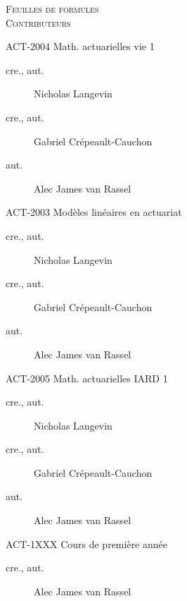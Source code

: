 \documentclass[10pt, french]{article}
\begin{document}
\center %

\textsc{\LARGE Feuilles de formules}\\[0.5cm]
\textsc{\Large Contributeurs}\\[0.5cm] 

\begin{multicols*}{3}

\begin{vie}{ACT-2004\: Math. actuarielles vie 1}
\begin{description}
	\item[cre., aut.] Nicholas Langevin
	\item[cre., aut.] Gabriel Crépeault-Cauchon 
	\item[aut.] Alec James van Rassel
\end{description}
\end{vie}

\begin{modeles}{ACT-2003\: Modèles linéaires en actuariat}
\begin{description}
	\item[cre., aut.] Nicholas Langevin
	\item[cre., aut.] Gabriel Crépeault-Cauchon 
	\item[aut.] Alec James van Rassel
\end{description}
\end{modeles}

\begin{IARD}{ACT-2005\: Math. actuarielles IARD 1}
\begin{description}
	\item[cre., aut.] Nicholas Langevin
	\item[cre., aut.] Gabriel Crépeault-Cauchon 
	\item[aut.] Alec James van Rassel
\end{description}
\end{IARD}

\begin{1XXX}{ACT-1XXX\: Cours de première année}
\begin{description}
	\item[cre., aut.] Alec James van Rassel
\end{description}
\end{1XXX}

\end{multicols*}
\end{document}
